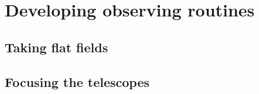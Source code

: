 \section{Developing observing routines}
\label{sec:obs_scripts}
\begin{colsection}


\begin{colsection}


\end{colsection}


\subsection{Taking flat fields}
\label{sec:flats}
\begin{colsection}

\citep{flats}

\end{colsection}


\subsection{Focusing the telescopes}
\label{sec:autofocus}
\begin{colsection}

\citep{autofocus}

\end{colsection}


\end{colsection}


\newpage
